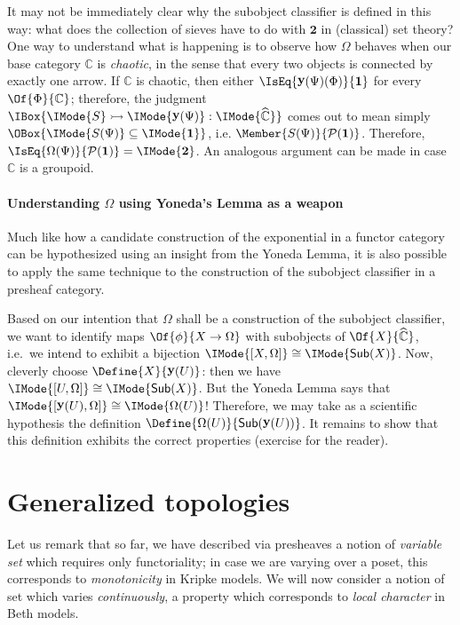\documentclass{article}
\DeclareMathOperator\OpYoneda{\mathbf{y}}
\newcommand\Yoneda[1]{\OpYoneda({#1})}
\newcommand\Psh[1]{\widehat{#1}}
\newcommand\IsSubobject[3]{\IMode{#1}\rightarrowtail\IMode{#2}:\IMode{#3}}
\newcommand\IsSubsetEq[2]{\IMode{#1}\subseteq\IMode{#2}}
\newcommand\One{\mathbf{1}}
\newcommand\Two{\mathbf{2}}
\newcommand\IsEquiv[2]{\IMode{#1}\cong\IMode{#2}}
\newcommand\Pow[1]{\mathcal{P} (#1)}
\newcommand\Sub[1]{\mathsf{Sub} (#1)}
\begin{document}
\begin{remark}
  It may not be immediately clear why the subobject classifier is
  defined in this way: what does the collection of sieves have to do
  with $\Two$ in (classical) set theory? One way to understand what is
  happening is to observe how $\Omega$ behaves when our base category
  $\mathbb{C}$ is \emph{chaotic}, in the sense that every two objects
  is connected by exactly one arrow.
%
  If $\mathbb{C}$ is chaotic, then either
  $\IsEq{\Yoneda{\Psi}(\Phi)}{\One}$ for every
  $\Of{\Phi}{\mathbb{C}}$; therefore, the judgment
  $\IBox{\IsSubobject{S}{\Yoneda{\Psi}}{\Psh{\mathbb{C}}}}$ comes out
  to mean simply $\OBox{\IsSubsetEq{S(\Psi)}{\One}}$,
  i.e. $\Member{S(\Psi)}{\Pow{\One}}$. Therefore,
  $\IsEq{\Omega(\Psi)}{\Pow{\One}}=\IMode{\Two}$. An analogous
  argument can be made in case $\mathbb{C}$ is a groupoid.
\end{remark}

\paragraph{Understanding $\Omega$ using Yoneda's Lemma as a weapon}
Much like how a candidate construction of the exponential in a functor
category can be hypothesized using an insight from the Yoneda Lemma,
it is also possible to apply the same technique to the construction of
the subobject classifier in a presheaf category.

Based on our intention that $\Omega$ shall be a construction of the
subobject classifier, we want to identify maps $\Of{\phi}{X\to\Omega}$
with subobjects of $\Of{X}{\Psh{\mathbb{C}}}$, i.e.\ we intend to
exhibit a bijection $\IsEquiv{[X,\Omega]}{\Sub{X}}$.
%
Now, cleverly choose $\Define{X}{\Yoneda{U}}$: then we have
$\IsEquiv{[U,\Omega]}{\Sub{X}}$. But the Yoneda Lemma says that
$\IsEquiv{[\Yoneda{U},\Omega]}{\Omega(U)}$! Therefore, we may take as
a scientific hypothesis the definition
$\Define{\Omega(U)}{\Sub{\Yoneda{U}}}$. It remains to show that this
definition exhibits the correct properties (exercise for the reader).

\section{Generalized topologies}

Let us remark that so far, we have described via presheaves a notion
of \emph{variable set} which requires only functoriality; in case we
are varying over a poset, this corresponds to \emph{monotonicity} in
Kripke models. We will now consider a notion of set which varies
\emph{continuously}, a property which corresponds to \emph{local
  character} in Beth models.
\end{document}
